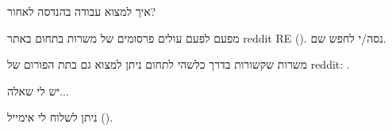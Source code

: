 \par איך למצוא עבודה בהנדסה לאחור?
\par מפעם לפעם עולים פרסומים של משרות בתחום באתר reddit RE\FNURLREDDIT{} (\RedditHiringThread{}). נסה/י לחפש שם.

משרות שקשורות בדרך כלשהי לתחום ניתן למצוא גם בתת הפורום  של reddit: \NetsecHiringThread{}.


\par יש לי שאלה...
\par ניתן לשלוח לי אימייל (\EMAIL).

